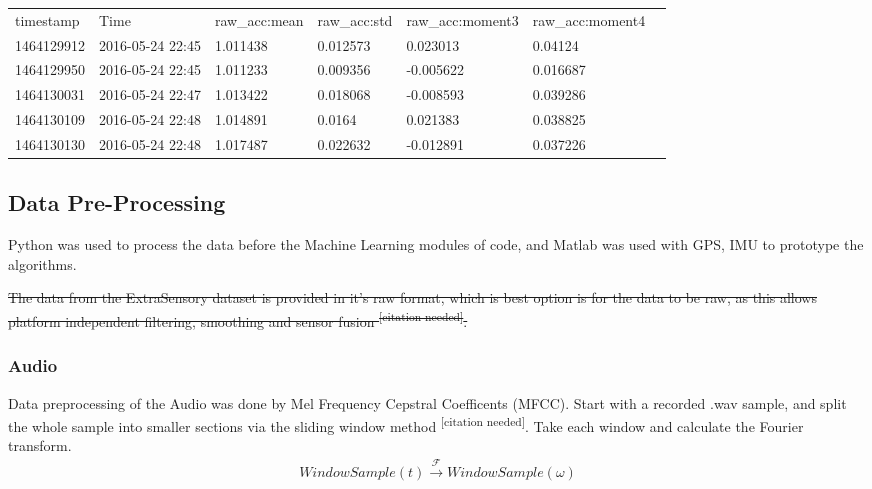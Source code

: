 \documentclass{UoNMCHA}
\newcommand{\citationneeded}{\textsuperscript{\color{blue} [citation needed]}}
\numberwithin{equation}{section}
\begin{document}
\begin{table}[]
    \begin{tabular}{lllllll}
    timestamp  & Time             & raw\_acc:mean & raw\_acc:std & raw\_acc:moment3 & raw\_acc:moment4 \\
    1464129912 & 2016-05-24 22:45 & 1.011438                       & 0.012573                      & 0.023013                          & 0.04124      \\
    1464129950 & 2016-05-24 22:45 & 1.011233                       & 0.009356                      & -0.005622                         & 0.016687     \\
    1464130031 & 2016-05-24 22:47 & 1.013422                       & 0.018068                      & -0.008593                         & 0.039286     \\
    1464130109 & 2016-05-24 22:48 & 1.014891                       & 0.0164                        & 0.021383                          & 0.038825     \\
    1464130130 & 2016-05-24 22:48 & 1.017487                       & 0.022632                      & -0.012891                         & 0.037226    
    \end{tabular}
\end{table}


\subsection{Data Pre-Processing}
Python was used to process the data before the Machine Learning modules of code, and Matlab was used with GPS, IMU to prototype the algorithms. 


 \sout{The data from the ExtraSensory dataset is provided in it's raw format, which is best option is for the data to be raw, as this allows platform independent filtering, smoothing and sensor fusion\citationneeded.} 

\subsubsection{Audio}
Data preprocessing of the Audio was done by Mel Frequency Cepstral Coefficents (MFCC). Start with a recorded .wav sample, and split the whole sample into smaller sections via the sliding window method\citationneeded. Take each window and calculate the Fourier transform.
\begin{gather}%
    WindowSample(t) \xrightarrow{\mathscr{F}}  WindowSample(\omega)
\end{gather}
\end{document}
